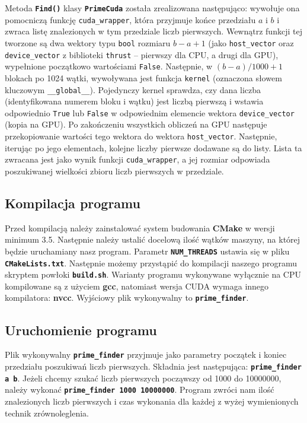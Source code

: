 \documentclass[12pt, twoside, hidelinks, a4paper]{article}
\begin{document}
Metoda \textbf{\texttt{Find()}} klasy \textbf{\texttt{PrimeCuda}} została zrealizowana następująco: wywołuje ona pomocniczą funkcję \texttt{cuda\_wrapper}, która przyjmuje końce przedziału $a$ i $b$ i zwraca listę znalezionych w tym przedziale liczb pierwszych. Wewnątrz funkcji tej tworzone są dwa wektory typu \texttt{bool} rozmiaru $b-a+1$ (jako \texttt{host\_vector} oraz \texttt{device\_vector} z biblioteki \texttt{thrust} -- pierwszy dla CPU, a drugi dla GPU), wypełnione początkowo wartościami \texttt{False}. Następnie, w $(b-a)/1000+1$ blokach po 1024 wątki, wywoływana jest funkcja \texttt{kernel} (oznaczona słowem kluczowym \texttt{\_\_global\_\_}). Pojedynczy kernel sprawdza, czy dana liczba (identyfikowana numerem bloku i wątku) jest liczbą pierwszą i wstawia odpowiednio \texttt{True} lub \texttt{False} w odpowiednim elemencie wektora \texttt{device\_vector} (kopia na GPU). Po zakończeniu wszystkich obliczeń na GPU następuje przekopiowanie wartości tego wektora do wektora \texttt{host\_vector}. Następnie, iterując po jego elementach, kolejne liczby pierwsze dodawane są do listy. Lista ta zwracana jest jako wynik funkcji \texttt{cuda\_wrapper}, a jej rozmiar odpowiada poszukiwanej wielkości zbioru liczb pierwszych w przedziale.

\subsection{Kompilacja programu}
Przed kompilacją należy zainstalować system budowania \textbf{CMake} w wersji minimum 3.5. Następnie należy ustalić docelową ilość wątków maszyny, na której będzie uruchamiany nasz program. Parametr \textbf{\texttt{NUM\_THREADS}} ustawia się w pliku \textbf{\texttt{CMakeLists.txt}}. Następnie możemy przystąpić do kompilacji naszego programu skryptem powłoki \textbf{\texttt{build.sh}}. Warianty programu wykonywane wyłącznie na CPU kompilowane są z użyciem \textbf{gcc}, natomiast wersja CUDA wymaga innego kompilatora: \textbf{nvcc}. Wyjściowy plik wykonywalny to \textbf{\texttt{prime\_finder}}.

\subsection{Uruchomienie programu}
Plik wykonywalny \textbf{\texttt{prime\_finder}} przyjmuje jako parametry początek i koniec przedziału poszukiwań liczb pierwszych. Składnia jest następująca: \textbf{\texttt{prime\_finder a b}}. Jeżeli chcemy szukać liczb pierwszych począwszy od 1000 do 10000000, należy wykonać \textbf{\texttt{prime\_finder 1000 10000000}}. Program zwróci nam ilość znalezionych liczb pierwszych i czas wykonania dla każdej z wyżej wymienionych technik zrównoleglenia.
\end{document}
